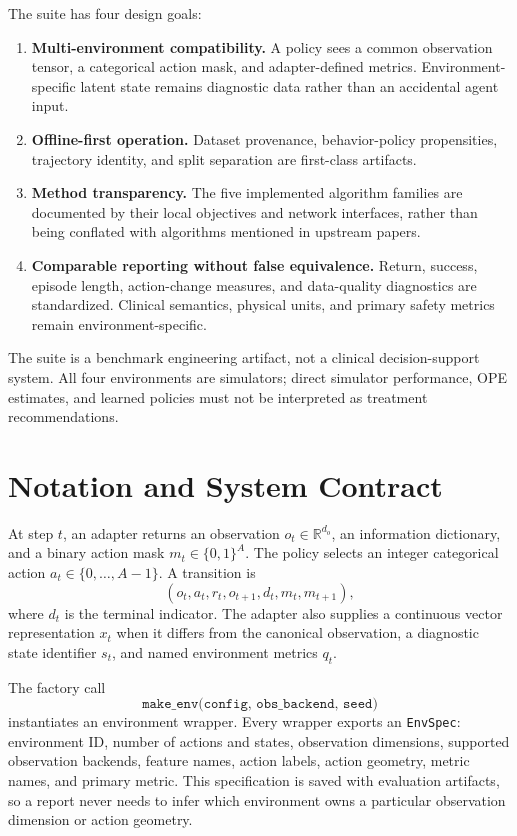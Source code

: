 \documentclass[10pt,twocolumn]{article}
\newcommand{\code}[1]{\texttt{#1}}
\newcommand{\R}{\mathbb{R}}
\begin{document}
The suite has four design goals:
\begin{enumerate}
    \item \textbf{Multi-environment compatibility.} A policy sees a common observation tensor, a categorical action mask, and adapter-defined metrics. Environment-specific latent state remains diagnostic data rather than an accidental agent input.
    \item \textbf{Offline-first operation.} Dataset provenance, behavior-policy propensities, trajectory identity, and split separation are first-class artifacts.
    \item \textbf{Method transparency.} The five implemented algorithm families are documented by their local objectives and network interfaces, rather than being conflated with algorithms mentioned in upstream papers.
    \item \textbf{Comparable reporting without false equivalence.} Return, success, episode length, action-change measures, and data-quality diagnostics are standardized. Clinical semantics, physical units, and primary safety metrics remain environment-specific.
\end{enumerate}

The suite is a benchmark engineering artifact, not a clinical decision-support system. All four environments are simulators; direct simulator performance, OPE estimates, and learned policies must not be interpreted as treatment recommendations.

\section{Notation and System Contract}
\label{sec:contract}

At step $t$, an adapter returns an observation $o_t \in \R^{d_o}$, an information dictionary, and a binary action mask $m_t \in \{0,1\}^{A}$. The policy selects an integer categorical action $a_t \in \{0,\ldots,A-1\}$. A transition is
\begin{equation}
    (o_t, a_t, r_t, o_{t+1}, d_t, m_t, m_{t+1}),
\end{equation}
where $d_t$ is the terminal indicator. The adapter also supplies a continuous vector representation $x_t$ when it differs from the canonical observation, a diagnostic state identifier $s_t$, and named environment metrics $q_t$.

The factory call
\begin{equation}
    \code{make\_env(config, obs\_backend, seed)}
\end{equation}
instantiates an environment wrapper. Every wrapper exports an \code{EnvSpec}: environment ID, number of actions and states, observation dimensions, supported observation backends, feature names, action labels, action geometry, metric names, and primary metric. This specification is saved with evaluation artifacts, so a report never needs to infer which environment owns a particular observation dimension or action geometry.
\end{document}

